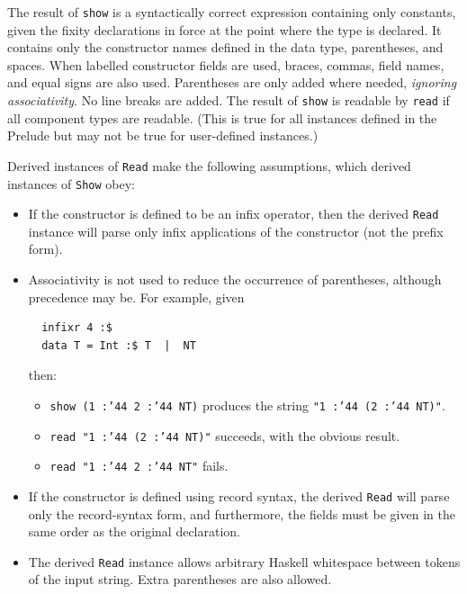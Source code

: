 The result of \mbox{\tt show} is a syntactically correct \Haskell{} expression
containing only constants, given the fixity declarations in force at
the point where the type is declared.  It contains only the
constructor names defined in the data type, parentheses, and
spaces. When labelled constructor fields are used, braces, commas,
field names, and equal signs are also used.  Parentheses
are only added where needed, {\em ignoring associativity}.  No line breaks
are added. The result of \mbox{\tt show} is readable by \mbox{\tt read} if all component
types are readable.  (This is true for all instances defined in the
Prelude but may not be true for user-defined instances.)

Derived instances of \mbox{\tt Read} make the following assumptions, 
which derived instances of \mbox{\tt Show} obey:
\begin{itemize}
\item If the constructor is defined to be an infix operator, then 
the derived \mbox{\tt Read} instance will parse only infix applications of the 
constructor (not the prefix form).

\item Associativity is not used to reduce the occurrence of 
parentheses, although precedence may be. For example, given
\bprog
{\small\begin{verbatim}
  infixr 4 :$
  data T = Int :$ T  |  NT
\end{verbatim}}
\eprog
then:
\begin{itemize}
\item \mbox{\tt show\ (1\ :{\char'44}\ 2\ :{\char'44}\ NT)} produces the string \mbox{\tt "1\ :{\char'44}\ (2\ :{\char'44}\ NT)"}.
\item \mbox{\tt read\ "1\ :{\char'44}\ (2\ :{\char'44}\ NT)"} succeeds, with the obvious result.
\item \mbox{\tt read\ "1\ :{\char'44}\ 2\ :{\char'44}\ NT"} fails.
\end{itemize}

\item 
If the constructor is defined using record syntax, the derived \mbox{\tt Read} 
will parse only the record-syntax form, and furthermore, the fields must be 
given in the same order as the original declaration.

\item The derived \mbox{\tt Read} instance allows arbitrary Haskell whitespace between 
tokens of the input string.  Extra parentheses are also allowed.
\end{itemize}


